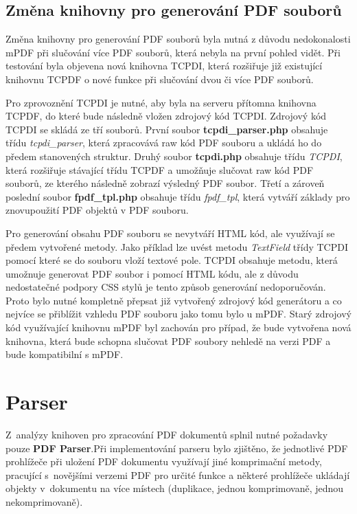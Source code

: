\subsection{Změna knihovny pro generování PDF souborů}
Změna knihovny pro generování PDF souborů byla nutná z důvodu nedokonalosti mPDF při slučování více PDF souborů, která nebyla na první pohled vidět. Při testování byla objevena nová knihovna TCPDI, která rozšiřuje již existující knihovnu TCPDF o nové funkce při slučování dvou či více PDF souborů. 
\par
Pro zprovoznění TCPDI je nutné, aby byla na serveru přítomna knihovna TCPDF, do které bude následně vložen zdrojový kód TCPDI. Zdrojový kód TCPDI se skládá ze tří souborů. První soubor \textbf{tcpdi\_parser.php} obsahuje třídu \textit{tcpdi\_parser}, která zpracovává raw kód PDF souboru a ukládá ho do předem stanovených struktur. Druhý soubor \textbf{tcpdi.php} obsahuje třídu \textit{TCPDI}, která rozšiřuje stávající třídu TCPDF a umožňuje slučovat raw kód PDF souborů, ze kterého následně zobrazí výsledný PDF soubor. Třetí a zároveň poslední soubor \textbf{fpdf\_tpl.php} obsahuje třídu \textit{fpdf\_tpl}, která vytváří základy pro znovupoužití PDF objektů v PDF souboru.
\par
Pro generování obsahu PDF souboru se nevytváří HTML kód, ale využívají se předem vytvořené metody. Jako příklad lze uvést metodu \textit{TextField} třídy TCPDI pomocí které se do souboru vloží textové pole. TCPDI obsahuje metodu, která umožnuje generovat PDF soubor i pomocí HTML kódu, ale z důvodu nedostatečné podpory CSS stylů je tento způsob generování nedoporučován. Proto bylo nutné kompletně přepsat již vytvořený zdrojový kód generátoru a co nejvíce se přiblížit vzhledu PDF souboru jako tomu bylo u mPDF. Starý zdrojový kód využívající knihovnu mPDF byl zachován pro případ, že bude vytvořena nová knihovna, která bude schopna slučovat PDF soubory nehledě na verzi PDF a bude kompatibilní s mPDF. 

\section{Parser}
Z~analýzy knihoven pro zpracování PDF dokumentů splnil nutné požadavky pouze \textbf{PDF Parser}.Při implementování parseru bylo zjištěno, že jednotlivé PDF prohlížeče při uložení PDF dokumentu využívají jiné komprimační metody, pracující s~novějšími verzemi PDF pro určité funkce a některé prohlížeče ukládají objekty v~dokumentu na více místech (duplikace, jednou komprimovaně, jednou nekomprimovaně).


